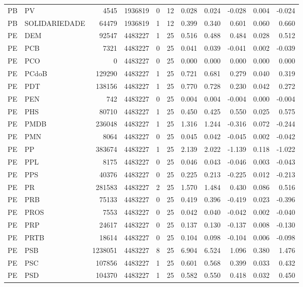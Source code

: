 \begin{landscape}
\begin{longtable}{llrrrrrrrrr}
PB & PV & 4545 & 1936819 & 0 & 12 & 0.028 & 0.024 & -0.028 & 0.004 & -0.024 \\
PB & SOLIDARIEDADE & 64479 & 1936819 & 1 & 12 & 0.399 & 0.340 & 0.601 & 0.060 & 0.660 \\
PE & DEM & 92547 & 4483227 & 1 & 25 & 0.516 & 0.488 & 0.484 & 0.028 & 0.512 \\
PE & PCB & 7321 & 4483227 & 0 & 25 & 0.041 & 0.039 & -0.041 & 0.002 & -0.039 \\
PE & PCO & 0 & 4483227 & 0 & 25 & 0.000 & 0.000 & 0.000 & 0.000 & 0.000 \\
PE & PCdoB & 129290 & 4483227 & 1 & 25 & 0.721 & 0.681 & 0.279 & 0.040 & 0.319 \\
PE & PDT & 138156 & 4483227 & 1 & 25 & 0.770 & 0.728 & 0.230 & 0.042 & 0.272 \\
PE & PEN & 742 & 4483227 & 0 & 25 & 0.004 & 0.004 & -0.004 & 0.000 & -0.004 \\
PE & PHS & 80710 & 4483227 & 1 & 25 & 0.450 & 0.425 & 0.550 & 0.025 & 0.575 \\
PE & PMDB & 236048 & 4483227 & 1 & 25 & 1.316 & 1.244 & -0.316 & 0.072 & -0.244 \\
PE & PMN & 8064 & 4483227 & 0 & 25 & 0.045 & 0.042 & -0.045 & 0.002 & -0.042 \\
PE & PP & 383674 & 4483227 & 1 & 25 & 2.139 & 2.022 & -1.139 & 0.118 & -1.022 \\
PE & PPL & 8175 & 4483227 & 0 & 25 & 0.046 & 0.043 & -0.046 & 0.003 & -0.043 \\
PE & PPS & 40376 & 4483227 & 0 & 25 & 0.225 & 0.213 & -0.225 & 0.012 & -0.213 \\
PE & PR & 281583 & 4483227 & 2 & 25 & 1.570 & 1.484 & 0.430 & 0.086 & 0.516 \\
PE & PRB & 75133 & 4483227 & 0 & 25 & 0.419 & 0.396 & -0.419 & 0.023 & -0.396 \\
PE & PROS & 7553 & 4483227 & 0 & 25 & 0.042 & 0.040 & -0.042 & 0.002 & -0.040 \\
PE & PRP & 24617 & 4483227 & 0 & 25 & 0.137 & 0.130 & -0.137 & 0.008 & -0.130 \\
PE & PRTB & 18614 & 4483227 & 0 & 25 & 0.104 & 0.098 & -0.104 & 0.006 & -0.098 \\
PE & PSB & 1238051 & 4483227 & 8 & 25 & 6.904 & 6.524 & 1.096 & 0.380 & 1.476 \\
PE & PSC & 107856 & 4483227 & 1 & 25 & 0.601 & 0.568 & 0.399 & 0.033 & 0.432 \\
PE & PSD & 104370 & 4483227 & 1 & 25 & 0.582 & 0.550 & 0.418 & 0.032 & 0.450 \\

\end{longtable}
\end{landscape}
